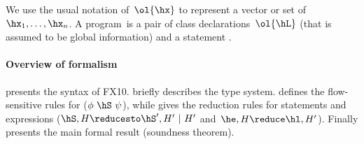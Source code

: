 We use the usual notation of~$\ol{\hx}$ to represent a vector or set of~$\hx_1, \ldots,\hx_n$.
A program~\hP is a pair of class declarations~$\ol{\hL}$ (that is assumed to be global information)
    and a statement \hS.

\paragraph{Overview of formalism}
 presents the syntax of FX10.
 briefly describes the type
system.  defines the flow-sensitive rules for
    ($\phi~\hS~\psi$), while
     gives the reduction rules for statements
    and expressions ($\hS,H \reducesto \hS',H' ~|~H'$
    and~$\he,H \reduce \hl,H'$). Finally 
    presents the main formal result (soundness theorem).



